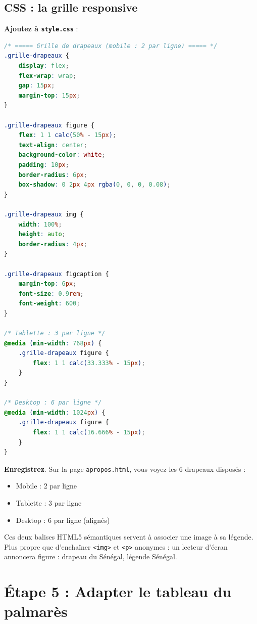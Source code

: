 \documentclass[11pt,a4paper]{article}
\newcommand{\cmark}{\ding{51}}
\begin{document}
\subsection{CSS : la grille responsive}

\textbf{Ajoutez à \texttt{style.css}} :

\begin{lstlisting}[language=CSS]
/* ===== Grille de drapeaux (mobile : 2 par ligne) ===== */
.grille-drapeaux {
    display: flex;
    flex-wrap: wrap;
    gap: 15px;
    margin-top: 15px;
}

.grille-drapeaux figure {
    flex: 1 1 calc(50% - 15px);
    text-align: center;
    background-color: white;
    padding: 10px;
    border-radius: 6px;
    box-shadow: 0 2px 4px rgba(0, 0, 0, 0.08);
}

.grille-drapeaux img {
    width: 100%;
    height: auto;
    border-radius: 4px;
}

.grille-drapeaux figcaption {
    margin-top: 6px;
    font-size: 0.9rem;
    font-weight: 600;
}

/* Tablette : 3 par ligne */
@media (min-width: 768px) {
    .grille-drapeaux figure {
        flex: 1 1 calc(33.333% - 15px);
    }
}

/* Desktop : 6 par ligne */
@media (min-width: 1024px) {
    .grille-drapeaux figure {
        flex: 1 1 calc(16.666% - 15px);
    }
}
\end{lstlisting}

\textbf{Enregistrez}. Sur la page \texttt{apropos.html}, vous voyez les
6 drapeaux disposés :
\begin{itemize}[nosep]
    \item Mobile : 2 par ligne
    \item Tablette : 3 par ligne
    \item Desktop : 6 par ligne (alignés)
\end{itemize}

\cmark

\begin{infobox}
Ces deux balises HTML5 sémantiques servent à associer une image à sa
légende. Plus propre que d'enchaîner \texttt{<img>} et \texttt{<p>}
anonymes : un lecteur d'écran annoncera \og{}figure : drapeau du Sénégal,
légende Sénégal\fg{}.
\end{infobox}

\newpage

\section{Étape 5 : Adapter le tableau du palmarès}
\end{document}
